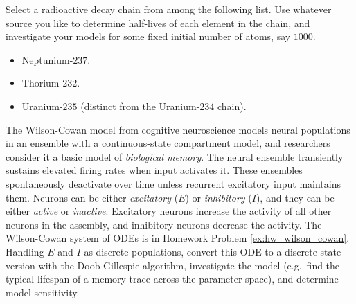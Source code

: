 \begin{modelingproject}

\item %
Select a radioactive decay chain from among the following list. Use whatever source you like to determine half-lives of each element in the chain, and investigate your models for some fixed initial number of atoms, say $1000$.
\begin{itemize}
\item Neptunium-$237$.
\item Thorium-$232$.
\item Uranium-$235$ (distinct from the Uranium-$234$ chain).
\end{itemize}




\item %
The Wilson-Cowan model from cognitive neuroscience models neural populations in an ensemble with a continuous-state compartment model, and researchers consider it a basic model of \textit{biological memory}. The neural ensemble transiently sustains elevated firing rates when input activates it. These ensembles spontaneously deactivate over time unless recurrent excitatory input maintains them. Neurons can be either \textit{excitatory} ($E$) or \textit{inhibitory} ($I$), and they can be either \textit{active} or \textit{inactive}. Excitatory neurons increase the activity of all other neurons in the assembly, and inhibitory neurons decrease the activity. The Wilson-Cowan system of ODEs is in Homework Problem \ref{ex:hw_wilson_cowan}. Handling $E$ and $I$ as discrete populations, convert this ODE to a discrete-state version with the Doob-Gillespie algorithm, investigate the model (e.g.\ find the typical lifespan of a memory trace across the parameter space), and determine model sensitivity.





\end{modelingproject}
